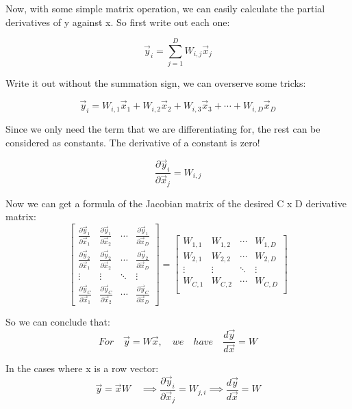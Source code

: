 \documentclass[letterpaper,12pt]{article}
\begin{document}
Now, with some simple matrix operation, we can easily calculate the partial
derivatives of y against x. So first write out each one:

\[\vec{y}_i=\sum_{j=1}^{D}W_{i,j}\vec{x}_j\]

Write it out without the summation sign, we can overserve some tricks:

\[\vec{y}_i=W_{i,1}\vec{x}_1+W_{i,2}\vec{x}_2+W_{i,3}\vec{x}_3+\cdots+W_{i,D}\vec{x}_D\]

Since we only need the term that we are differentiating for, the rest can be
considered as constants. The derivative of a constant is zero!

\[
    \frac{\partial \vec{y}_i}{\partial \vec{x}_j} = W_{i,j}
\]

Now we can get a formula of the Jacobian matrix of the desired C x D derivative
matrix:
\[
    \begin{bmatrix}
        \frac{\partial\vec{y}_1}{\partial\vec{x}_1} & \frac{\partial\vec{y}_1}{\partial\vec{x}_2} & \cdots & \frac{\partial\vec{y}_1}{\partial\vec{x}_D} \\
        \frac{\partial\vec{y}_2}{\partial\vec{x}_1} & \frac{\partial\vec{y}_2}{\partial\vec{x}_2} & \cdots & \frac{\partial\vec{y}_2}{\partial\vec{x}_D} \\
        \vdots                                      & \vdots                                      & \ddots & \vdots                                      \\
        \frac{\partial\vec{y}_C}{\partial\vec{x}_1} & \frac{\partial\vec{y}_C}{\partial\vec{x}_2} & \cdots & \frac{\partial\vec{y}_C}{\partial\vec{x}_D}
    \end{bmatrix}
    =
    \begin{bmatrix}
        W_{1,1} & W_{1,2} & \cdots & W_{1,D} \\
        W_{2,1} & W_{2,2} & \cdots & W_{2,D} \\
        \vdots  & \vdots  & \ddots & \vdots  \\
        W_{C,1} & W_{C,2} & \cdots & W_{C,D} \\
    \end{bmatrix}
\]

So we can conclude that:
\[
    For \quad \vec{y}=W\vec{x},\quad we\quad have \quad \frac{d\vec{y}}{d\vec{x}} = W
\]

In the cases where x is a row vector:
\[
    \vec{y}=\vec{x}W\quad \implies     \frac{\partial \vec{y}_i}{\partial \vec{x}_j} = W_{j,i} \implies \frac{d\vec{y}}{d\vec{x}} = W
\]
\end{document}

